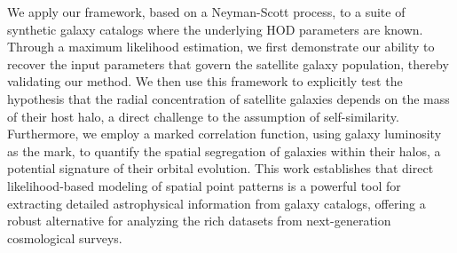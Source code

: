 \documentclass[]{article}
\begin{document}
We apply our framework, based on a Neyman-Scott process, to a suite of synthetic galaxy catalogs where the underlying HOD parameters are known. Through a maximum likelihood estimation, we first demonstrate our ability to recover the input parameters that govern the satellite galaxy population, thereby validating our method. We then use this framework to explicitly test the hypothesis that the radial concentration of satellite galaxies depends on the mass of their host halo, a direct challenge to the assumption of self-similarity. Furthermore, we employ a marked correlation function, using galaxy luminosity as the mark, to quantify the spatial segregation of galaxies within their halos, a potential signature of their orbital evolution. This work establishes that direct likelihood-based modeling of spatial point patterns is a powerful tool for extracting detailed astrophysical information from galaxy catalogs, offering a robust alternative for analyzing the rich datasets from next-generation cosmological surveys.
\end{document}
